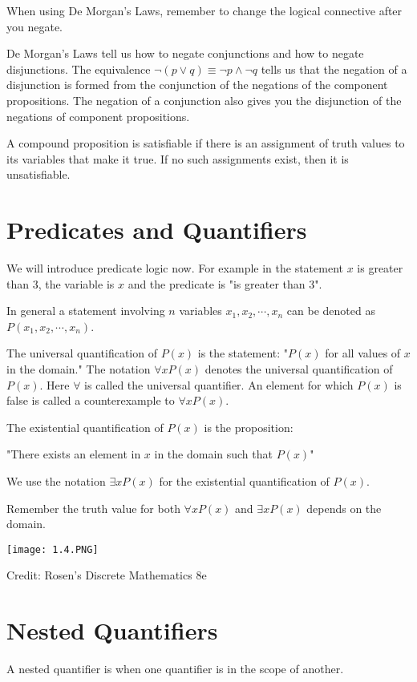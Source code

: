 \documentclass[../discrete.tex]{subfiles}
\begin{document}
When using De Morgan's Laws, remember to change the logical connective after you negate. 

De Morgan's Laws tell us how to negate conjunctions and how to negate disjunctions. The equivalence $\neg(p\lor q)\equiv \neg p \land \neg q$ tells us that the negation of a disjunction is formed from the conjunction of the negations of the component propositions. The negation of a conjunction also gives you the disjunction of the negations of component propositions.

A compound proposition is satisfiable if there is an assignment of truth values to its variables that make it true. If no such assignments exist, then it is unsatisfiable. 
\section{Predicates and Quantifiers}
We will introduce predicate logic now. For example in the statement $x$ is greater than 3, the variable is $x$ and the predicate is "is greater than 3".

In general a statement involving $n$ variables $x_1,x_2,\cdots,x_n$ can be denoted as $P(x_1,x_2,\cdots,x_n)$. 

\begin{definition}
    The universal quantification of $P(x)$ is the statement:
    \smallbreak
    "$P(x)$ for all values of $x$ in the domain."
    \smallbreak
    The notation $\forall x P(x)$ denotes the universal quantification of $P(x)$. Here $\forall$ is called the universal quantifier. An element for which $P(x)$ is false is called a counterexample to $\forall x P(x)$.
\end{definition}
\begin{definition}
    The existential quantification of $P(x)$ is the proposition:

    "There exists an element in $x$ in the domain such that $P(x)$"

    We use the notation $\exists x P(x)$ for the existential quantification of $P(x)$.
\end{definition}
Remember the truth value for both $\forall x P(x)$ and $\exists x P(x)$ depends on the domain.
\begin{center}
    \texttt{[image: 1.4.PNG]}
\end{center}
Credit: Rosen's Discrete Mathematics 8e

\section{Nested Quantifiers}
A nested quantifier is when one quantifier is in the scope of another.
\end{document}
